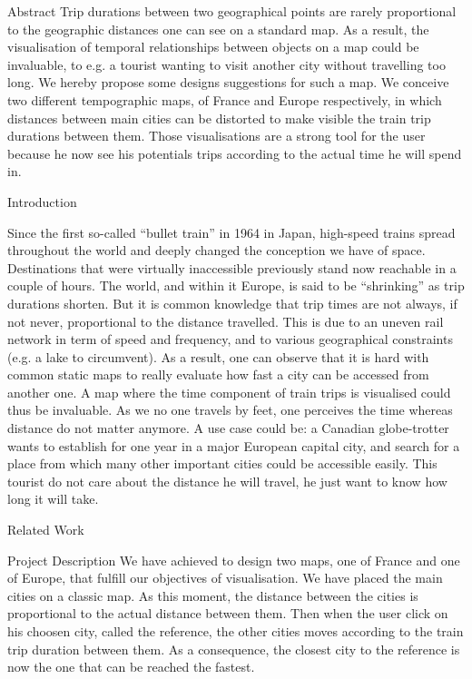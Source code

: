 Abstract
Trip durations between two geographical points are rarely proportional to the geographic distances one can see on a standard map. As a result, the visualisation of temporal relationships between objects on a map could be invaluable, to e.g. a tourist wanting to visit another city without travelling too long. We hereby propose some designs suggestions for such a map. We conceive two different tempographic maps, of France and Europe respectively, in which distances between main cities can be distorted to make visible the train trip durations between them. Those visualisations are a strong tool for the user because he now see his potentials trips according to the actual time he will spend in.

Introduction

Since the first so-called “bullet train” in 1964 in Japan, high-speed trains spread throughout the world and deeply changed the conception we have of space. Destinations that were virtually inaccessible previously stand now reachable in a couple of hours. The world, and within it Europe, is said to be “shrinking” as trip durations shorten. But it is common knowledge that trip times are not always, if not never, proportional to the distance travelled. This is due to an uneven rail network in term of speed and frequency, and to various geographical constraints (e.g. a lake to circumvent). As a result, one can observe that it is hard with common static maps to really evaluate how fast a city can be accessed from another one. A map where the time component of train trips is visualised could thus be invaluable. As we no one travels by feet, one perceives the time whereas distance do not matter anymore. A use case could be: a Canadian globe-trotter wants to establish for one year in a major European capital city, and search for a place from which many other important cities could be accessible easily. This tourist do not care about the distance he will travel, he just want to know how long it will take.


Related Work

Project Description
We have achieved to design two maps, one of France and one of Europe, that fulfill our objectives of visualisation. We have placed the main cities on a classic map. As this moment, the distance between the cities is proportional to the actual distance between them. Then when the user click on his choosen city, called the reference, the other cities moves according to the train trip duration between them. As a consequence, the closest city to the reference is now the one that can be reached the fastest.
\picture{}

